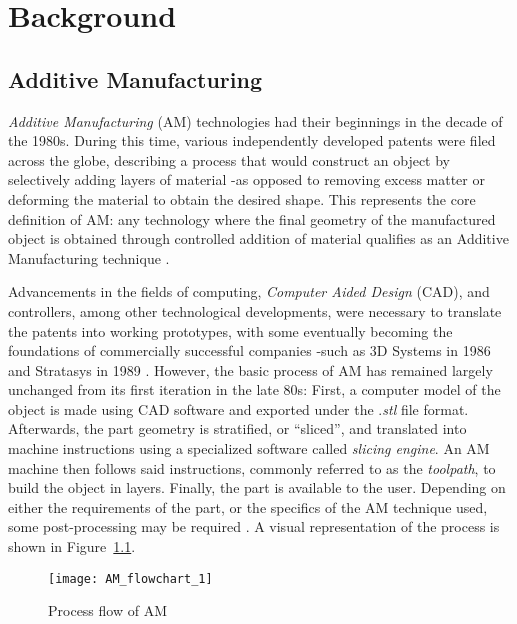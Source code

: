 \documentclass[main.tex]{subfiles}
\begin{document}
\chapter{Background}
\section{Additive Manufacturing}\label{sec:AM} %
\emph{Additive Manufacturing} (AM) technologies had their beginnings in the decade of the 1980s. During this time, various independently developed patents were filed across the globe, describing a process that would construct an object by selectively adding layers of material -as opposed to removing excess matter or deforming the material to obtain the desired shape. This represents the core definition of AM: any technology where the final geometry of the manufactured object is obtained through controlled addition of material qualifies as an Additive Manufacturing technique \cite{Gibson2015}.

Advancements in the fields of computing, \emph{Computer Aided Design} (CAD), and controllers, among other technological developments, were necessary to translate the patents into working prototypes, with some eventually becoming the foundations of commercially successful companies -such as 3D Systems in 1986 and Stratasys in 1989 \cite{Gibson2015,3DSystems,Stratasys2017}. However, the basic process of AM has remained largely unchanged from its first iteration in the late 80s: First, a computer model of the object is made using CAD software and exported under the .\emph{stl} file format. Afterwards, the part geometry is stratified, or \textquotedblleft sliced\textquotedblright, and translated into machine instructions using a specialized software called \emph{slicing engine}. An AM machine then follows said instructions, commonly referred to as the \emph{toolpath}, to build the object in layers. Finally, the part is available to the user. Depending on either the requirements of the part, or the specifics of the AM technique used, some post-processing may be required \cite{Gibson2015}. A visual representation of the process is shown in Figure~\ref{fig:AM_flow}.

\begin{figure}[h]
	\center
	\texttt{[image: AM\_flowchart\_1]}
	\caption{Process flow of AM} \label{fig:AM_flow}
\end{figure}
\end{document}

